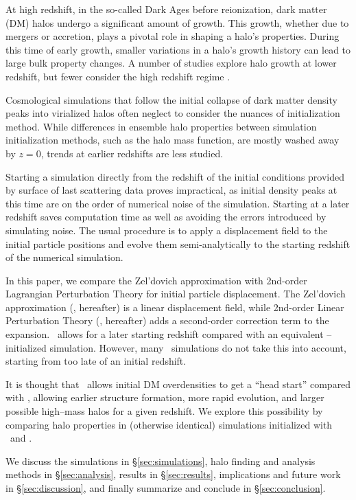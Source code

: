 At high redshift, in the so-called Dark Ages before reionization, dark matter (DM) halos undergo a significant amount of growth.  This growth, whether due to mergers or accretion, plays a pivotal role in shaping a halo's properties.  During this time of early growth, smaller variations in a halo's growth history can lead to large bulk property changes.  A number of studies explore halo growth at lower redshift\cn, but fewer consider the high redshift regime \cn.

Cosmological simulations that follow the initial collapse of dark matter density peaks into virialized halos often neglect to consider the nuances of initialization method.  While differences in ensemble halo properties between simulation initialization methods, such as the halo mass function, are mostly washed away by $z=0$\cn, trends at earlier redshifts are less studied.

Starting a simulation directly from the redshift of the initial conditions provided by surface of last scattering data proves impractical, as initial density peaks at this time are on the order of numerical noise of the simulation.  Starting at a later redshift saves computation time as well as avoiding the errors introduced by simulating noise.  The usual procedure is to apply a displacement field to the initial particle positions and evolve them semi-analytically to the starting redshift of the numerical simulation.

In this paper, we compare the Zel'dovich approximation with 2nd-order Lagrangian Perturbation Theory for initial particle displacement.  The Zel'dovich approximation (\za, hereafter) is a linear displacement field, while 2nd-order Linear Perturbation Theory (\lpt, hereafter) adds a second-order correction term to the expansion.  \lpt\ allows for a later starting redshift compared with an equivalent \za--initialized simulation.  However, many \za\ simulations do not take this into account, starting from too late of an initial redshift\cn.

It is thought that \lpt\ allows initial DM overdensities to get a ``head start'' compared with \za, allowing earlier structure formation, more rapid evolution, and larger possible high--mass halos for a given redshift.  We explore this possibility by comparing halo properties in (otherwise identical) simulations initialized with \za\ and \lpt.

We discuss the simulations in \S\ref{sec:simulations}, halo finding and analysis methods in \S\ref{sec:analysis}, results in \S\ref{sec:results}, implications and future work in \S\ref{sec:discussion}, and finally summarize and conclude in \S\ref{sec:conclusion}.
